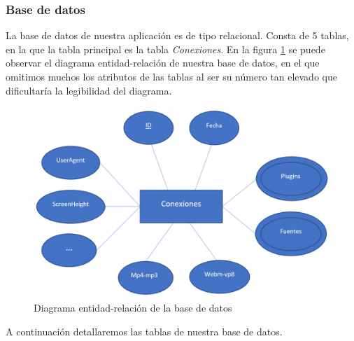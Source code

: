 \subsubsection{Base de datos}
La base de datos de nuestra aplicación es de tipo relacional. Consta de 5 tablas, en la que la tabla principal es la tabla \textit{Conexiones}. En la figura \ref{fig:diagramaEntidadRelacion} se puede observar el diagrama entidad-relación de nuestra base de datos, en el que omitimos muchos los atributos de las tablas al ser su número tan elevado que dificultaría la legibilidad del diagrama.
\begin{figure}[tbp]
    \centering
    \includegraphics[width=1\textwidth]{Images/entidad relacion.png}
    \caption{Diagrama entidad-relación de la base de datos}
    \label{fig:diagramaEntidadRelacion}
\end{figure}
A continuación detallaremos las tablas de nuestra base de datos.
